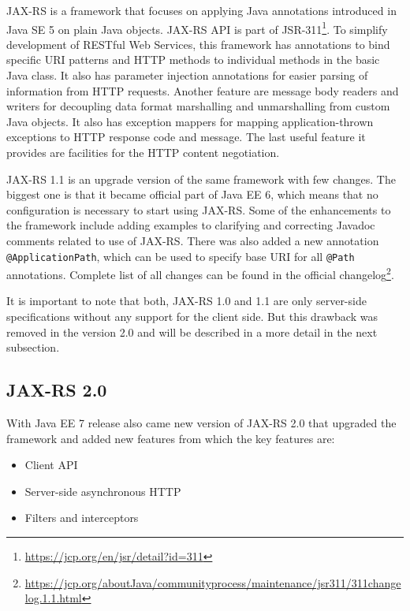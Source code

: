\documentclass[12pt,final,oneside]{fithesis2}
\begin{document}
JAX-RS is a framework that focuses on applying Java annotations introduced in Java SE 5 on plain Java objects. JAX-RS API is part of JSR-311\footnote{\url{https://jcp.org/en/jsr/detail?id=311}}. To simplify development of RESTful Web Services, this framework has annotations to bind specific URI patterns and HTTP methods to individual methods in the basic Java class. It also has parameter injection annotations for easier parsing of information from HTTP requests. Another feature are message body readers and writers for decoupling data format marshalling and unmarshalling from custom Java objects. It also has exception mappers for mapping application-thrown exceptions to HTTP response code and message. The last useful feature  it provides are facilities for the HTTP content negotiation.\cite{resteasy-book}\cite{jax-wiki}

JAX-RS 1.1 is an upgrade version of the same framework with few changes. The biggest one is that it became official part of Java EE 6, which means that no configuration is necessary to start using JAX-RS. Some of the enhancements to the framework include adding examples to clarifying and correcting Javadoc comments related to use of JAX-RS. There was also added a new annotation \texttt{@ApplicationPath}, which can be used to specify base URI for all \texttt{@Path} annotations. Complete list of all changes can be found in the official changelog\footnote{\url{https://jcp.org/aboutJava/communityprocess/maintenance/jsr311/311changelog.1.1.html}}. \cite{jax-1.1}\cite{jax-1.1-2}

It is important to note that both, JAX-RS 1.0 and 1.1 are only server-side specifications without any support for the client side. But this drawback was removed in the version 2.0 and will be described in a more detail in the next subsection.

\subsection{JAX-RS 2.0}\label{jax2.0}
With Java EE 7 release also came new version of JAX-RS 2.0 that upgraded the framework and added new features from which the key features are:
\begin{itemize}
\item
Client API

\item 
Server-side asynchronous HTTP

\item
Filters and interceptors
\end{itemize}
\end{document}
